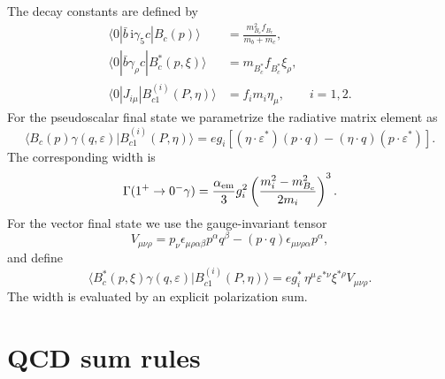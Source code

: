 \documentclass[aps,prd,preprint,nofootinbib,superscriptaddress]{revtex4-2}
\newcommand{\ii}{\mathrm{i}}
\newcommand{\Bc}{B_c}
\newcommand{\Bcst}{B_c^\ast}
\newcommand{\Bcone}{B_{c1}}
\begin{document}
The decay constants are defined by
\begin{align}
  \langle 0|\bar b\,\ii\gamma_5 c|\Bc(p)\rangle
  &= \frac{m_{\Bc}^2 f_{\Bc}}{m_b+m_c},\\
  \langle 0|\bar b\gamma_\rho c|\Bcst(p,\xi)\rangle
  &= m_{\Bcst}f_{\Bcst}\xi_\rho,\\
  \langle0|J_{i\mu}|\Bcone^{(i)}(P,\eta)\rangle
  &= f_i m_i \eta_\mu,\qquad i=1,2 .
  \label{eq:decay-constants}
\end{align}
For the pseudoscalar final state we parametrize the radiative matrix element as
\begin{equation}
  \langle \Bc(p)\gamma(q,\varepsilon)|\Bcone^{(i)}(P,\eta)\rangle
  =
  e g_i
  \left[
  (\eta\cdot\varepsilon^*)(p\cdot q)
  -(\eta\cdot q)(p\cdot\varepsilon^*)
  \right].
  \label{eq:ps-matrix}
\end{equation}
The corresponding width is
\begin{equation}
  \Gamma(1^+\to0^-\gamma)
  =
  \frac{\alpha_{\rm em}}{3}g_i^2
  \left(\frac{m_i^2-m_{\Bc}^2}{2m_i}\right)^3 .
  \label{eq:ps-width}
\end{equation}
For the vector final state we use the gauge-invariant tensor
\begin{equation}
  V_{\mu\nu\rho}
  =
  p_\nu\epsilon_{\mu\rho\alpha\beta}p^\alpha q^\beta
  -(p\cdot q)\epsilon_{\mu\nu\rho\alpha}p^\alpha ,
  \label{eq:v-tensor}
\end{equation}
and define
\begin{equation}
  \langle \Bcst(p,\xi)\gamma(q,\varepsilon)|\Bcone^{(i)}(P,\eta)\rangle
  =
  e g_i^\ast\,\eta^\mu\varepsilon^{\ast\nu}\xi^{\ast\rho}V_{\mu\nu\rho}.
  \label{eq:vec-matrix}
\end{equation}
The width is evaluated by an explicit polarization sum.

\section{QCD sum rules}
\label{sec:qcdsr}
\end{document}

